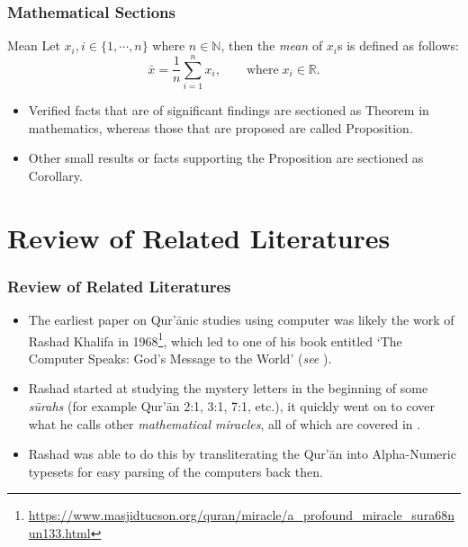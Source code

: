 \documentclass{beamer}
\theoremstyle{definition}
\begin{document}
\begin{frame}[t, fragile]\justifying
    \frametitle{Mathematical Sections}
    \begin{block}{Mean}\label{defn:mean-1}
    Let $x_i, i\in\{1,\cdots,n\}$ where $n\in\mathbb{N}$, then the \textit{mean} of $x_i$s is defined as follows:
    \begin{equation}\label{eq:mean-formula-1}
        \bar{x} = \frac{1}{n}\sum_{i=1}^n x_i, \qquad\text{where}\;x_i \in\mathbb{R}.
    \end{equation}
    \end{block}
    \begin{itemize}
        \item Verified facts that are of significant findings are sectioned as Theorem in mathematics, whereas those that are proposed are called Proposition. 
        \item Other small results or facts supporting the Proposition are sectioned as Corollary.
    \end{itemize}
\end{frame}
    
\section{Review of Related Literatures}
\begin{frame}[t, fragile]\justifying
    \frametitle{Review of Related Literatures}
    \begin{itemize}
        \item The earliest paper on Qur'\=anic studies using computer was likely the work of Rashad Khalifa in 1968\footnote{\url{https://www.masjidtucson.org/quran/miracle/a_profound_miracle_sura68nun133.html}}, which led to one of his book entitled `The Computer Speaks: God's Message to the World' (\textit{see} \cite{rashad1981}).
        \item Rashad started at studying the mystery letters in the beginning of some \textit{s\=urahs}  (for example Qur'\=an 2:1, 3:1, 7:1, etc.), it quickly went on to cover what he calls other \textit{mathematical miracles}, all of which are covered in \cite{rashad1981}.
        \item Rashad was able to do this by transliterating the Qur'\=an into Alpha-Numeric typesets for easy parsing of the computers back then.
    \end{itemize}
\end{frame}
\end{document}
